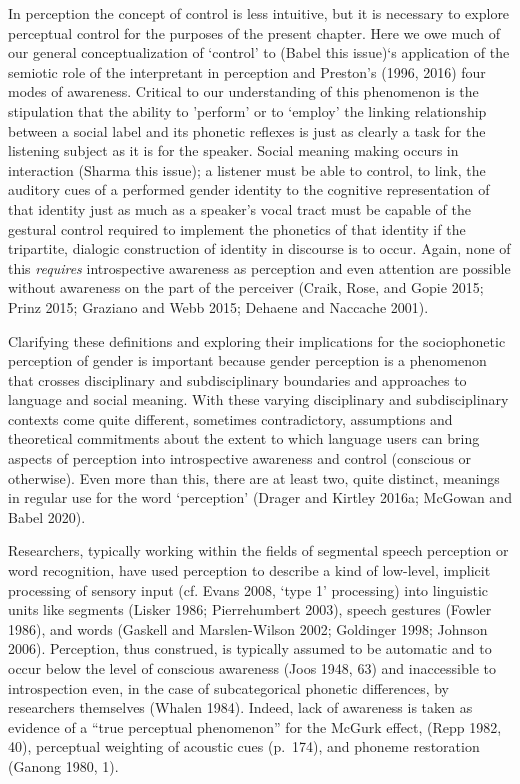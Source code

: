 \documentclass[
  letterpaper,
  DIV=11,
  numbers=noendperiod]{scrartcl}
\begin{document}
In perception the concept of control is less intuitive, but it is
necessary to explore perceptual control for the purposes of the present
chapter. Here we owe much of our general conceptualization of `control'
to (Babel this issue)`s application of the semiotic role of the
interpretant in perception and Preston's (1996, 2016) four modes of
awareness. Critical to our understanding of this phenomenon is the
stipulation that the ability to 'perform' or to `employ' the linking
relationship between a social label and its phonetic reflexes is just as
clearly a task for the listening subject as it is for the speaker.
Social meaning making occurs in interaction (Sharma this issue); a
listener must be able to control, to link, the auditory cues of a
performed gender identity to the cognitive representation of that
identity just as much as a speaker's vocal tract must be capable of the
gestural control required to implement the phonetics of that identity if
the tripartite, dialogic construction of identity in discourse is to
occur. Again, none of this \emph{requires} introspective awareness as
perception and even attention are possible without awareness on the part
of the perceiver (Craik, Rose, and Gopie 2015; Prinz 2015; Graziano and
Webb 2015; Dehaene and Naccache 2001).

Clarifying these definitions and exploring their implications for the
sociophonetic perception of gender is important because gender
perception is a phenomenon that crosses disciplinary and subdisciplinary
boundaries and approaches to language and social meaning. With these
varying disciplinary and subdisciplinary contexts come quite different,
sometimes contradictory, assumptions and theoretical commitments about
the extent to which language users can bring aspects of perception into
introspective awareness and control (conscious or otherwise). Even more
than this, there are at least two, quite distinct, meanings in regular
use for the word `perception' (Drager and Kirtley 2016a; McGowan and
Babel 2020).

Researchers, typically working within the fields of segmental speech
perception or word recognition, have used perception to describe a kind
of low-level, implicit processing of sensory input (cf. Evans 2008,
`type 1' processing) into linguistic units like segments (Lisker 1986;
Pierrehumbert 2003), speech gestures (Fowler 1986), and words (Gaskell
and Marslen-Wilson 2002; Goldinger 1998; Johnson 2006). Perception, thus
construed, is typically assumed to be automatic and to occur below the
level of conscious awareness (Joos 1948, 63) and inaccessible to
introspection even, in the case of subcategorical phonetic differences,
by researchers themselves (Whalen 1984). Indeed, lack of awareness is
taken as evidence of a ``true perceptual phenomenon'' for the McGurk
effect, (Repp 1982, 40), perceptual weighting of acoustic cues (p.~174),
and phoneme restoration (Ganong 1980, 1).
\end{document}
